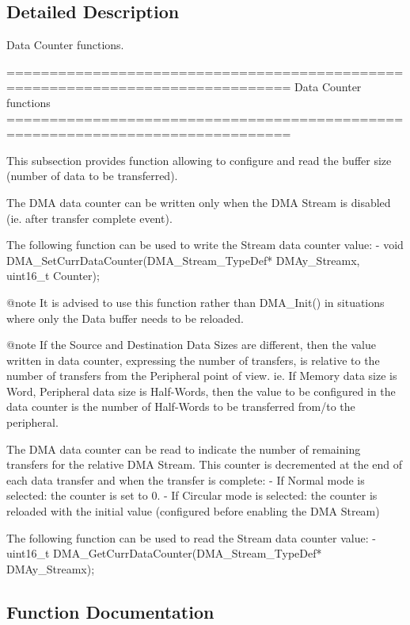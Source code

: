 \subsection{Detailed Description}
Data Counter functions. 

\begin{DoxyVerb} ===============================================================================
                           Data Counter functions
 ===============================================================================  

  This subsection provides function allowing to configure and read the buffer size
  (number of data to be transferred). 

  The DMA data counter can be written only when the DMA Stream is disabled 
  (ie. after transfer complete event).

  The following function can be used to write the Stream data counter value:
    - void DMA_SetCurrDataCounter(DMA_Stream_TypeDef* DMAy_Streamx, uint16_t Counter);

@note It is advised to use this function rather than DMA_Init() in situations where
      only the Data buffer needs to be reloaded.

@note If the Source and Destination Data Sizes are different, then the value written in
      data counter, expressing the number of transfers, is relative to the number of 
      transfers from the Peripheral point of view.
      ie. If Memory data size is Word, Peripheral data size is Half-Words, then the value
      to be configured in the data counter is the number of Half-Words to be transferred
      from/to the peripheral.

  The DMA data counter can be read to indicate the number of remaining transfers for
  the relative DMA Stream. This counter is decremented at the end of each data 
  transfer and when the transfer is complete: 
   - If Normal mode is selected: the counter is set to 0.
   - If Circular mode is selected: the counter is reloaded with the initial value
     (configured before enabling the DMA Stream)
   
  The following function can be used to read the Stream data counter value:
     - uint16_t DMA_GetCurrDataCounter(DMA_Stream_TypeDef* DMAy_Streamx);\end{DoxyVerb}
 

\subsection{Function Documentation}
\mbox{\label{group___d_m_a___group2_ga4a76444a92423f5f15a4328738d6dc46}} 
